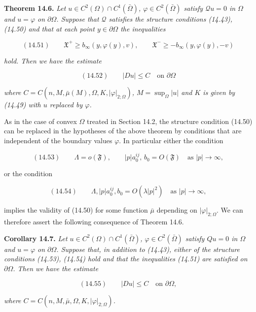 \begin{theorem}\label{gt14-boundary-gradient-14-6}
\noindent\textbf{Theorem 14.6.} \textit{Let $u\in C^2(\Omega)\cap C^1(\bar\Omega)$, $\varphi\in C^2(\bar\Omega)$
satisfy $\mathcal Q u=0$ in $\Omega$ and $u=\varphi$ on $\partial\Omega$. Suppose that $\mathcal Q$ satisfies the
structure conditions (14.43), (14.50) and that at each point $y\in\partial\Omega$ the inequalities}

\[
(14.51)\qquad \mathfrak X^+ \ge b_\infty(y,\varphi(y),v),\qquad
\mathfrak X^- \ge -b_\infty(y,\varphi(y),-v)
\]

\textit{hold. Then we have the estimate}

\[
(14.52)\qquad |Du|\le C \quad \text{on }\partial\Omega
\]

\textit{where $C=C(n,M,\bar\mu(M),\Omega,K,|\varphi|_{2;\Omega})$, $M=\sup_{\Omega}|u|$ and $K$ is given by
(14.49) with $u$ replaced by $\varphi$.}
\end{theorem}

\medskip

As in the case of convex $\Omega$ treated in Section 14.2, the structure condition (14.50) can be replaced in the
hypotheses of the above theorem by conditions that are independent of the boundary values $\varphi$. In particular
either the condition

\[
(14.53)\qquad \Lambda=o(\mathfrak F),\qquad |p|a_0^{ij},\, b_0=O(\mathfrak F)\quad \text{as }|p|\to\infty,
\]




or the condition

\[
(14.54)\qquad \Lambda, |p|a^{ij}_0, b_0 = O(\lambda |p|^2)\quad \text{as } |p| \to \infty,
\]

implies the validity of (14.50) for some function $\bar{\mu}$ depending on
$|\varphi|_{2;\Omega}$. We can therefore assert the following consequence of
Theorem 14.6.

\medskip

\begin{corollary}\label{gt14-boundary-gradient-14-7}
\noindent\textbf{Corollary 14.7.} \textit{Let $u \in C^2(\Omega) \cap C^1(\bar{\Omega})$,
$\varphi \in C^2(\bar{\Omega})$ satisfy $Qu = 0$ in $\Omega$ and $u = \varphi$
on $\partial\Omega$. Suppose that, in addition to (14.43), either of the
structure conditions (14.53), (14.54) hold and that the inequalities (14.51)
are satisfied on $\partial\Omega$. Then we have the estimate}

\[
(14.55)\qquad |Du| \le C \quad \text{on } \partial\Omega,
\]

\noindent\textit{where $C = C(n, M, \bar{\mu}, \Omega, K, |\varphi|_{2;\Omega})$.}
\end{corollary}


